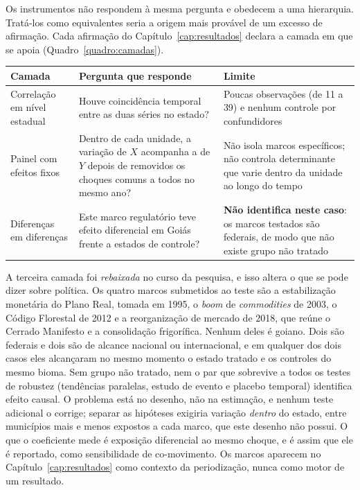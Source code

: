 Os instrumentos não respondem à mesma pergunta e obedecem a uma hierarquia.
Tratá-los como equivalentes seria a origem mais provável de um excesso de
afirmação. Cada afirmação do Capítulo~\ref{cap:resultados} declara a camada em
que se apoia (Quadro~\ref{quadro:camadas}).

\begin{quadro}[htb]
\centering
\caption[Camadas de exigência por tipo de desenho]{Camadas de exigência: o que cada desenho consegue responder.}
\label{quadro:camadas}
\small
\begin{tabular}{p{2.6cm}p{5.0cm}p{6.0cm}}
\toprule
\textbf{Camada} & \textbf{Pergunta que responde} & \textbf{Limite} \\
\midrule
Correlação em nível estadual &
Houve coincidência temporal entre as duas séries no estado? &
Poucas observações (de 11 a 39) e nenhum controle por confundidores \\
\addlinespace
Painel com efeitos fixos &
Dentro de cada unidade, a variação de $X$ acompanha a de $Y$ depois de
removidos os choques comuns a todos no mesmo ano? &
Não isola marcos específicos; não controla determinante que varie dentro
da unidade ao longo do tempo \\
\addlinespace
Diferenças em diferenças &
Este marco regulatório teve efeito diferencial em Goiás frente a estados
de controle? &
\textbf{Não identifica neste caso}: os marcos testados são federais, de
modo que não existe grupo não tratado \\
\bottomrule
\end{tabular}
\end{quadro}

A terceira camada foi \emph{rebaixada} no curso da pesquisa, e isso altera o
que se pode dizer sobre política. Os quatro marcos submetidos ao teste são a
estabilização monetária do Plano Real, tomada em 1995, o \emph{boom} de
\emph{commodities} de 2003, o Código Florestal de 2012 e a reorganização de mercado
de 2018, que reúne o Cerrado Manifesto e a consolidação frigorífica. Nenhum
deles é goiano. Dois são federais e dois são de alcance nacional ou
internacional, e em qualquer dos dois casos eles alcançaram no mesmo momento o
estado tratado e os controles do mesmo bioma. Sem grupo não tratado, nem o par
que sobrevive a todos os testes de robustez (tendências paralelas, estudo de
evento e placebo temporal) identifica efeito
causal. O problema está no desenho, não na estimação, e nenhum teste adicional
o corrige; separar as hipóteses exigiria variação \emph{dentro} do estado,
entre municípios mais e menos expostos a cada marco, que este desenho não
possui. O que o coeficiente mede é exposição diferencial ao mesmo choque, e é
assim que ele é reportado, como sensibilidade de co-movimento. Os marcos
aparecem no Capítulo~\ref{cap:resultados} como contexto da
periodização, nunca como motor de um resultado.

